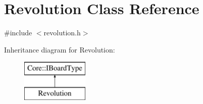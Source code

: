 \hypertarget{class_revolution}{\section{\-Revolution \-Class \-Reference}
\label{class_revolution}
}


{\ttfamily \#include $<$revolution.\-h$>$}

\-Inheritance diagram for \-Revolution\-:\begin{figure}[H]
\begin{center}
\leavevmode
\includegraphics[height=2.000000cm]{class_revolution}
\end{center}
\end{figure}
